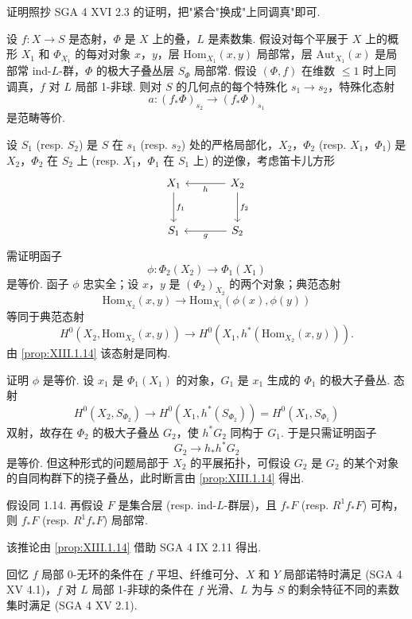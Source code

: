 证明照抄 SGA 4 XVI 2.3 的证明，把"紧合"换成"上同调真"即可.

\begin{corollary}\label{cor:XIII.1.15}
设 $f \colon X \to S$ 是态射，$\Phi$ 是 $X$ 上的叠，$L$ 是素数集. 假设对每个平展于 $X$ 上的概形 $X_1$ 和 $\Phi_{X_1}$ 的每对对象 $x$，$y$，层 $\mathrm{Hom}_{X_1}(x, y)$ 局部常，层 $\mathrm{Aut}_{X_1}(x)$ 是局部常 ind-$L$-群，$\Phi$ 的极大子叠丛层 $S_\Phi$ \cite[III 2.1.7]{exp13-1} 局部常. 假设 $(\Phi, f)$ 在维数 $\leqslant 1$ 时上同调真，$f$ 对 $L$ 局部 1-非球. 则对 $S$ 的几何点的每个特殊化 $s_1 \to s_2$，特殊化态射
\[
a \colon (f_* \Phi)_{s_2} \longrightarrow (f_* \Phi)_{s_1}
\]
是范畴等价.
\end{corollary}

设 $S_1$ (resp. $S_2$) 是 $S$ 在 $s_1$ (resp. $s_2$) 处的严格局部化，$X_2$，$\Phi_2$ (resp. $X_1$，$\Phi_1$) 是 $X_2$，$\Phi_2$ 在 $S_2$ 上 (resp. $X_1$，$\Phi_1$ 在 $S_1$ 上) 的逆像，考虑笛卡儿方形
\[
\begin{tikzcd}[row sep=large, column sep=large]
X_1 \arrow[d,"{f_1}"] & X_2 \arrow[l,"h"] \arrow[d,"{f_2}"] \\
S_1 & S_2 \arrow[l,"g"]
\end{tikzcd}
\]
需证明函子
\[
\phi \colon \Phi_2(X_2) \longrightarrow \Phi_1(X_1)
\]
是等价. 函子 $\phi$ 忠实全；设 $x$，$y$ 是 $(\Phi_2)_{X_2}$ 的两个对象；典范态射
\[
\mathrm{Hom}_{X_2}(x, y) \longrightarrow \mathrm{Hom}_{X_1}(\phi(x), \phi(y))
\]
等同于典范态射
\[
H^0(X_2, \mathrm{Hom}_{X_2}(x, y)) \longrightarrow H^0(X_1, h^{*}(\mathrm{Hom}_{X_2}(x, y))).
\]
由 \ref{prop:XIII.1.14} 该态射是同构.

证明 $\phi$ 是等价. 设 $x_1$ 是 $\Phi_1(X_1)$ 的对象，$G_1$ 是 $x_1$ 生成的 $\Phi_1$ 的极大子叠丛. 态射
\[
H^0(X_2, S_{\Phi_2}) \longrightarrow H^0(X_1, h^{*}(S_{\Phi_2})) = H^0(X_1, S_{\Phi_1})
\]
双射，故存在 $\Phi_2$ 的极大子叠丛 $G_2$，使 $h^{*} G_2$ 同构于 $G_1$. 于是只需证明函子
\[
G_2 \longrightarrow h_* h^{*} G_2
\]
是等价. 但这种形式的问题局部于 $X_2$ 的平展拓扑，可假设 $G_2$ 是 $G_2$ 的某个对象的自同构群下的挠子叠丛，此时断言由 \ref{prop:XIII.1.14} 得出.

\begin{corollary}\label{cor:XIII.1.16}
假设同 1.14. 再假设 $F$ 是集合层 (resp. ind-$L$-群层)，且 $f_* F$ (resp. $R^1 f_* F$) 可构，则 $f_* F$ (resp. $R^1 f_* F$) 局部常.
\end{corollary}

该推论由 \ref{prop:XIII.1.14} 借助 SGA 4 IX 2.11 得出.

\begin{remark}\label{rem:XIII.1.17}
回忆 $f$ 局部 0-无环的条件在 $f$ 平坦、纤维可分、$X$ 和 $Y$ 局部诺特时满足 (SGA 4 XV 4.1)，$f$ 对 $L$ 局部 1-非球的条件在 $f$ 光滑、$L$ 为与 $S$ 的剩余特征不同的素数集时满足 (SGA 4 XV 2.1).
\end{remark}

